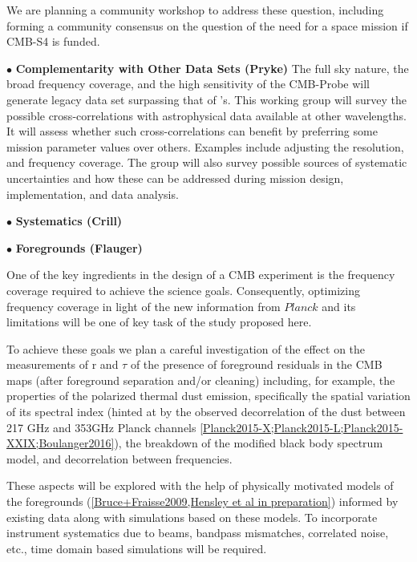 We are planning a community workshop to address these question, including forming a community consensus on the 
question of the need for a space mission if CMB-S4 is funded. 

$\bullet$ {\bf Complementarity with Other Data Sets (Pryke)} \hspace{0.1in}
The full sky nature, the broad frequency coverage, and the high sensitivity of the CMB-Probe will generate legacy 
data set surpassing that of \planck 's. This working group will survey the possible cross-correlations with astrophysical 
data available at other wavelengths. It will assess whether such cross-correlations can benefit by preferring 
some mission parameter values over others. Examples include adjusting the resolution, and frequency coverage. 
The group will also survey possible sources of systematic uncertainties and how these can be addressed during mission 
design, implementation, and data analysis. 

$\bullet$ {\bf Systematics (Crill)} \hspace{0.1in}

$\bullet$ {\bf Foregrounds (Flauger) } \hspace{0.1in}

One of the key ingredients in the design of a CMB experiment is the frequency coverage required to achieve the science goals. Consequently, optimizing frequency coverage in light of the new information from $Planck$ and its limitations will be one of key task of the study proposed here. 

To achieve these goals we plan a careful investigation of the effect on the measurements of r and $\tau$ of the presence of foreground residuals in the CMB maps (after foreground separation and/or cleaning) including, for example, the properties of the polarized thermal dust emission, specifically the spatial variation of its spectral index (hinted at by the observed decorrelation of the dust between 217 GHz and 353GHz Planck channels \ref{Planck2015-X;Planck2015-L;Planck2015-XXIX;Boulanger2016}), the breakdown of the modified black body spectrum model, and decorrelation between frequencies. 

These aspects will be explored with the help of physically motivated models of the foregrounds (\ref{Bruce+Fraisse2009,Hensley et al in preparation}) informed by existing data along with simulations based on these models. To incorporate instrument systematics due to beams, bandpass mismatches, correlated noise, etc., time domain based simulations will be required.

